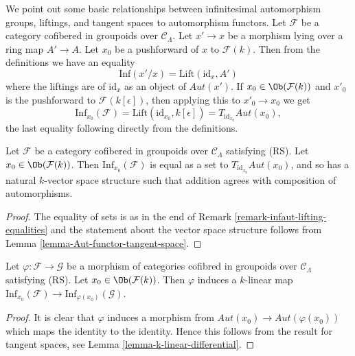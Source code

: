\begin{remark}
\label{remark-infaut-lifting-equalities}
We point out some basic relationships between infinitesimal automorphism
groups, liftings, and tangent spaces to automorphism functors. Let
$\mathcal{F}$ be a category cofibered in groupoids over $\mathcal{C}_\Lambda$.
Let $x' \to x$ be a morphism lying over a ring map $A' \to A$.  Let
$x_0$ be a pushforward of $x$ to $\mathcal{F}(k)$.
Then from the definitions we have an equality
$$
\text{Inf}(x'/x) = \text{Lift}(\text{id}_x, A')
$$
where the liftings are of $\text{id}_x$ as an object of
$\mathit{Aut}(x')$.  If $x_0 \in \Ob(\mathcal{F}(k))$ and $x'_0$
is the pushforward to $\mathcal{F}(k[\epsilon])$, then applying this to
$x'_0 \to x_0$ we get
$$
\text{Inf}_{x_0}(\mathcal{F}) =
\text{Lift}(\text{id}_{x_0}, k[\epsilon]) =
T_{\text{id}_{x_0}} \mathit{Aut}(x_0),
$$
the last equality following directly from the definitions.
\end{remark}

\begin{lemma}
\label{lemma-infaut-vector-space}
Let $\mathcal{F}$ be a category cofibered in groupoids over
$\mathcal{C}_\Lambda$ satisfying (RS). Let $x_0 \in \Ob(\mathcal{F}(k))$.
Then $\text{Inf}_{x_0}(\mathcal{F})$ is equal as a set to
$T_{\text{id}_{x_0}} \mathit{Aut}(x_0)$, and so has a natural $k$-vector
space structure such that addition agrees with composition of automorphisms.
\end{lemma}

\begin{proof}
The equality of sets is as in the end of
Remark \ref{remark-infaut-lifting-equalities}
and the statement about the vector space structure follows from
Lemma \ref{lemma-Aut-functor-tangent-space}.
\end{proof}

\begin{lemma}
\label{lemma-k-linear-infaut}
Let $\varphi : \mathcal{F} \to \mathcal{G}$ be a morphism of categories
cofibred in groupoids over $\mathcal{C}_\Lambda$ satisfying (RS).
Let $x_0 \in \Ob(\mathcal{F}(k))$. Then $\varphi$ induces a $k$-linear
map $\text{Inf}_{x_0}(\mathcal{F}) \to \text{Inf}_{\varphi(x_0)}(\mathcal{G})$.
\end{lemma}

\begin{proof}
It is clear that $\varphi$ induces a morphism from
$\mathit{Aut}(x_0) \to \mathit{Aut}(\varphi(x_0))$
which maps the identity to the identity. Hence this follows from
the result for tangent spaces, see
Lemma \ref{lemma-k-linear-differential}.
\end{proof}

